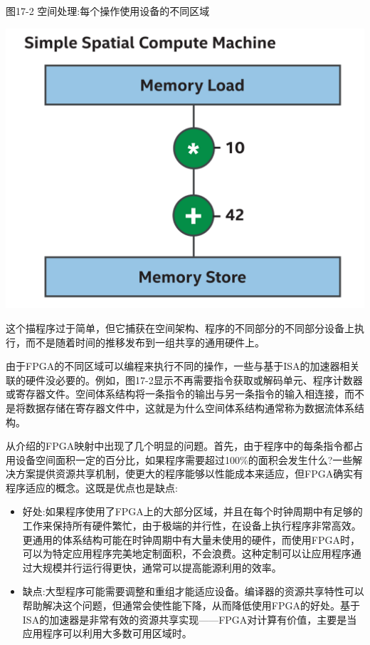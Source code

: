 \hspace*{\fill} \par %
图17-2 空间处理:每个操作使用设备的不同区域
\begin{center}
	\includegraphics[width=1.0\textwidth]{content/chapter-17/images/3}
\end{center}

这个描程序过于简单，但它捕获在空间架构、程序的不同部分的不同部分设备上执行，而不是随着时间的推移发布到一组共享的通用硬件上。\par

由于FPGA的不同区域可以编程来执行不同的操作，一些与基于ISA的加速器相关联的硬件没必要的。例如，图17-2显示不再需要指令获取或解码单元、程序计数器或寄存器文件。空间体系结构将一条指令的输出与另一条指令的输入相连接，而不是将数据存储在寄存器文件中，这就是为什么空间体系结构通常称为数据流体系结构。\par

从介绍的FPGA映射中出现了几个明显的问题。首先，由于程序中的每条指令都占用设备空间面积一定的百分比，如果程序需要超过100\%的面积会发生什么?一些解决方案提供资源共享机制，使更大的程序能够以性能成本来适应，但FPGA确实有程序适应的概念。这既是优点也是缺点:\par

\begin{itemize}
	\item 好处:如果程序使用了FPGA上的大部分区域，并且在每个时钟周期中有足够的工作来保持所有硬件繁忙，由于极端的并行性，在设备上执行程序非常高效。更通用的体系结构可能在时钟周期中有大量未使用的硬件，而使用FPGA时，可以为特定应用程序完美地定制面积，不会浪费。这种定制可以让应用程序通过大规模并行运行得更快，通常可以提高能源利用的效率。
	\item 缺点:大型程序可能需要调整和重组才能适应设备。编译器的资源共享特性可以帮助解决这个问题，但通常会使性能下降，从而降低使用FPGA的好处。基于ISA的加速器是非常有效的资源共享实现——FPGA对计算有价值，主要是当应用程序可以利用大多数可用区域时。
\end{itemize}

